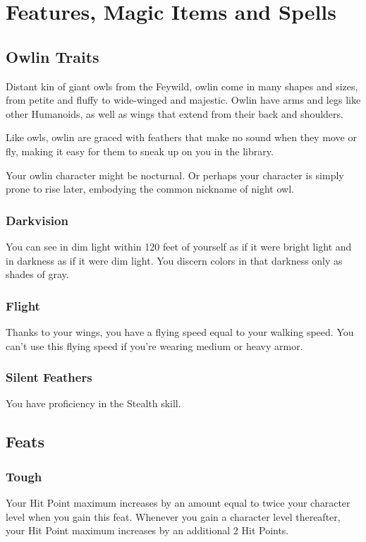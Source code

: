 \documentclass[letterpaper,openany,oneside,twocolumn]{book}
\begin{document}
\onecolumn


\rendercharactersheet

\renderbackgroundsheet



\restoregeometry
\twocolumn

\chapter*{Features, Magic Items and Spells}

\section*{Owlin Traits}
Distant kin of giant owls from the Feywild, owlin come in many shapes and sizes, from petite and fluffy to wide-winged and majestic. Owlin have arms and legs like other Humanoids, as well as wings that extend from their back and shoulders.

Like owls, owlin are graced with feathers that make no sound when they move or fly, making it easy for them to sneak up on you in the library.

Your owlin character might be nocturnal. Or perhaps your character is simply prone to rise later, embodying the common nickname of night owl.
\subsection*{Darkvision}
You can see in dim light within 120 feet of yourself as if it were bright light and in darkness as if it were dim light. You discern colors in that darkness only as shades of gray.
\subsection*{Flight}
Thanks to your wings, you have a flying speed equal to your walking speed. You can't use this flying speed if you're wearing medium or heavy armor.
\subsection*{Silent Feathers}
You have proficiency in the Stealth skill.

\section*{Feats}
\subsection*{Tough}
Your Hit Point maximum increases by an amount equal to twice your character level when you gain this feat. Whenever you gain a character level thereafter, your Hit Point maximum increases by an additional 2 Hit Points.
\end{document}
